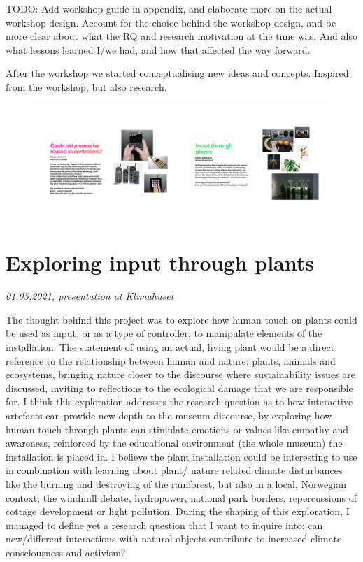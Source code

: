 TODO: Add workshop guide in appendix, and elaborate more on the actual workshop design. Account for the choice behind the workshop design, and be more clear about what the RQ and research motivation at the time was. And also what lessons learned I/we had, and how that affected the way forward.

After the workshop we started conceptualising new ideas and concepts. Inspired from the workshop, but also research.

\begin{figure}[H]
\includegraphics[width=13cm]{pictures/process/mini_pitches.png}
\centering 
\end{figure}

\section{Exploring input through plants}
\par
\emph{01.05.2021, presentation at Klimahuset}
\par

The thought behind this project was to explore how human touch on plants could be used as input, or as a type of controller, to manipulate elements of the installation. The statement of using an actual, living plant would be a direct reference to the relationship between human and nature: plants, animals and ecosystems, bringing nature closer to the discourse where sustainability issues are discussed, inviting to reflections to the ecological damage that we are responsible for. I think this exploration addresses the research question as to how interactive artefacts can provide new depth to the museum discourse, by exploring how human touch through plants can stimulate emotions or values like empathy and awareness, reinforced by the educational environment (the whole museum) the installation is placed in. I believe the plant installation could be interesting to use in combination with learning about plant/ nature related climate disturbances like the burning and destroying of the rainforest, but also in a local, Norwegian context; the windmill debate, hydropower, national park borders, repercussions of cottage development or light pollution. During the shaping of this exploration, I managed to define yet a research question that I want to inquire into; can new/different interactions with natural objects contribute to increased climate consciousness and activism?	

